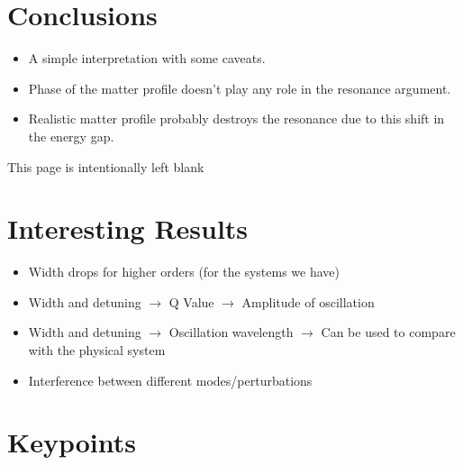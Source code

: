\documentclass[%
preprint,
 amsmath,amssymb,
 aps,
]{revtex4-1}
\begin{document}
\section{\label{conclusions}Conclusions}



\begin{itemize}
    \item A simple interpretation with some caveats.
    \item Phase of the matter profile doesn't play any role in the resonance argument.
    \item Realistic matter profile probably destroys the resonance due to this shift in the energy gap.
\end{itemize}














\newpage\null\thispagestyle{empty}
\vspace{20em}
This page is intentionally left blank
\newpage


\clearpage
\appendix
\section{Interesting Results}


\begin{itemize}
    \item
Width drops for higher orders (for the systems we have)
    
    \item
Width and detuning $\to$ Q Value $\to$ Amplitude of oscillation
    
    \item
Width and detuning $\to$ Oscillation wavelength $\to$ Can be used to compare with the physical system

    \item
Interference between different modes/perturbations

\end{itemize}




\clearpage

\section{Keypoints}
\end{document}
